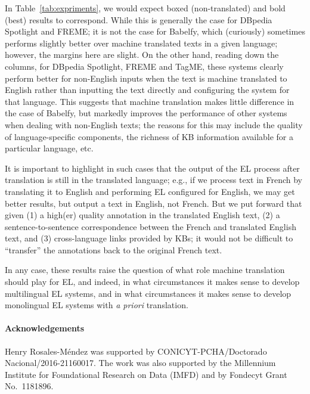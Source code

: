 \documentclass{llncs}
\begin{document}
In Table~\ref{tab:expriments}, we would expect boxed (non-translated) and bold (best) results to correspond. While this is generally the case for DBpedia Spotlight and FREME; it is not the case for Babelfy, which (curiously) sometimes performs slightly better over machine translated texts in a given language; however, the margins here are slight. On the other hand, reading down the columns, for DBpedia Spotlight, FREME and TagME, these systems clearly perform better for non-English inputs when the text is machine translated to English rather than inputting the text directly and configuring the system for that language. This suggests that machine translation makes little difference in the case of Babelfy, but markedly improves the performance of other systems when dealing with non-English texts; the reasons for this may include the quality of language-specific components, the richness of KB information available for a particular language, etc. 

It is important to highlight in such cases that the output of the EL process after translation is still in the translated language; e.g., if we process text in French by translating it to English and performing EL configured for English, we may get better results, but output a text in English, not French. But we put forward that given (1) a high(er) quality annotation in the translated English text, (2) a sentence-to-sentence correspondence between the French and translated English text, and (3) cross-language links provided by KBs; it would not be difficult to ``transfer'' the annotations back to the original French text. 

In any case, these results raise the question of what role machine translation should play for EL, and indeed, in what circumstances it makes sense to develop multilingual EL systems, and in what circumstances it makes sense to develop monolingual EL systems with \textit{a priori} translation. 

{\footnotesize
\paragraph{Acknowledgements} Henry Rosales-M\'endez was supported by CONICYT-PCHA/Doc\-torado Nacional/2016-21160017. The work was also supported by the Millennium Institute for Foundational Research on Data (IMFD) and by Fondecyt Grant No.\ 1181896.
}
\end{document}
